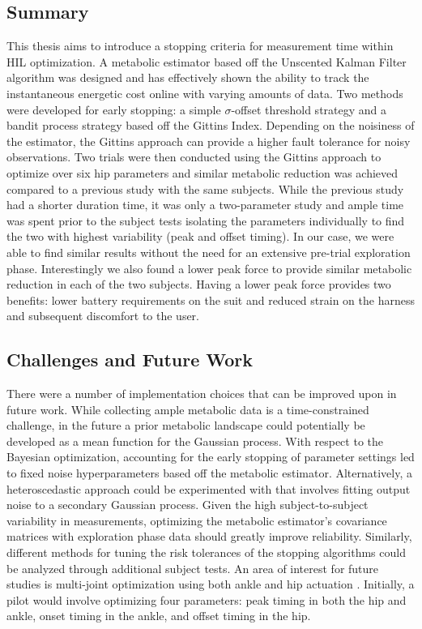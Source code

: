 \subsection*{Summary}
This thesis aims to introduce a stopping criteria for measurement time within HIL optimization. A metabolic estimator based off the Unscented Kalman Filter algorithm was designed and has effectively shown the ability to track the instantaneous energetic cost online with varying amounts of data. Two methods were developed for early stopping: a simple $\sigma$-offset threshold strategy and a bandit process strategy based off the Gittins Index. Depending on the noisiness of the estimator, the Gittins approach can provide a higher fault tolerance for noisy observations. Two trials were then conducted using the Gittins approach to optimize over six hip parameters and similar metabolic reduction was achieved compared to a previous study with the same subjects. While the previous study had a shorter duration time, it was only a two-parameter study and ample time was spent prior to the subject tests isolating the parameters individually to find the two with highest variability (peak and offset timing). In our case, we were able to find similar results without the need for an extensive pre-trial exploration phase. Interestingly we also found a lower peak force to provide similar metabolic reduction in each of the two subjects. Having a lower peak force provides two benefits: lower battery requirements on the suit and reduced strain on the harness and subsequent discomfort to the user.

\subsection*{Challenges and Future Work}
There were a number of implementation choices that can be improved upon in future work. While collecting ample metabolic data is a time-constrained challenge, in the future a prior metabolic landscape could potentially be developed as a mean function for the Gaussian process. With respect to the Bayesian optimization, accounting for the early stopping of parameter settings led to fixed noise hyperparameters based off the metabolic estimator. Alternatively, a heteroscedastic approach could be experimented with that involves fitting output noise to a secondary Gaussian process. Given the high subject-to-subject variability in measurements, optimizing the metabolic estimator's covariance matrices with exploration phase data should greatly improve reliability. Similarly, different methods for tuning the risk tolerances of the stopping algorithms could be analyzed through additional subject tests. An area of interest for future studies is multi-joint optimization using both ankle and hip actuation \citep{1298569}. Initially, a pilot would involve optimizing four parameters: peak timing in both the hip and ankle, onset timing in the ankle, and offset timing in the hip. 